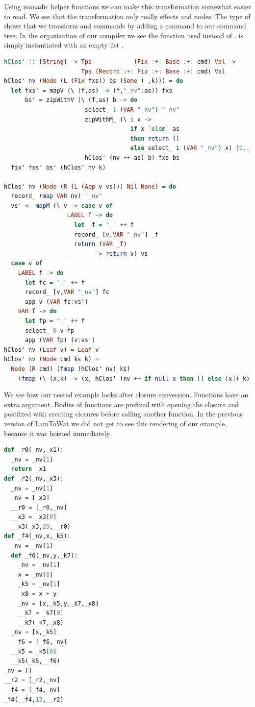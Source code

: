 Using monadic helper functions we can make this transformation somewhat easier to read. We see that the transformation only really effects  and  nodes. The type of  shows that we transform  and  commands by adding a  command to our command tree. In the organization of our compiler we see the function  used instead of .  is simply  instantiated with an empty list .

\begin{lstlisting}[language=Haskell]
hClos' :: [String] -> Tps            (Fix :+: Base :+: cmd) Val -> 
                      Tps (Record :+: Fix :+: Base :+: cmd) Val
hClos' nv (Node (L (Fix fxs)) bs (Some (_,k))) = do
  let fxs' = mapV (\ (f,as) -> (f,"_nv":as)) fxs
      bs' = zipWithV (\ (f,as) b -> do
                       select_ 1 (VAR "_nv") "_nv"
                       zipWithM_ (\ i x ->
                                    if x `elem` as
                                    then return ()
                                    else select_ i (VAR "_nv") x) [0..] nv
                       hClos' (nv ++ as) b) fxs bs
  fix' fxs' bs' (hClos' nv k)

hClos' nv (Node (R (L (App v vs))) Nil None) = do
  record_ (map VAR nv) "_nv"
  vs' <- mapM (\ v -> case v of
                  LABEL f -> do
                    let _f = "_" ++ f
                    record_ [v,VAR "_nv"] _f
                    return (VAR _f)
                  _       -> return v) vs
  case v of
    LABEL f -> do
      let fc = "_" ++ f
      record_ [v,VAR "_nv"] fc
      app v (VAR fc:vs')
    VAR f -> do
      let fp = "_" ++ f
      select_ 0 v fp
      app (VAR fp) (v:vs')
hClos' nv (Leaf v) = Leaf v
hClos' nv (Node cmd ks k) =
  Node (R cmd) (fmap (hClos' nv) ks)
    (fmap (\ (x,k) -> (x, hClos' (nv ++ if null x then [] else [x]) k)) k)
\end{lstlisting}

We see how our nested example  looks after closure conversion. Functions have an extra  argument. Bodies of functions are prefixed with opening the closure and postfixed with creating closures before calling another function. In the previous version of LamToWat we did not get to see this rendering of our example, because it was hoisted immediately.

\begin{lstlisting}[language=Python]
def _r0(_nv,_x1):
  _nv = _nv[1]
  return _x1
def _r2(_nv,_x3):
  _nv = _nv[1]
  _nv = [_x3]
  __r0 = [_r0,_nv]
  __x3 = _x3[0]
  __x3(_x3,29,__r0)
def _f4(_nv,x,_k5):
  _nv = _nv[1]
  def _f6(_nv,y,_k7):
    _nv = _nv[1]
    x = _nv[0]
    _k5 = _nv[1]
    _x8 = x + y
    _nv = [x,_k5,y,_k7,_x8]
    __k7 = _k7[0]
    __k7(_k7,_x8)
  _nv = [x,_k5]
  __f6 = [_f6,_nv]
  __k5 = _k5[0]
  __k5(_k5,__f6)
_nv = []
__r2 = [_r2,_nv]
__f4 = [_f4,_nv]
_f4(__f4,13,__r2)
\end{lstlisting}

